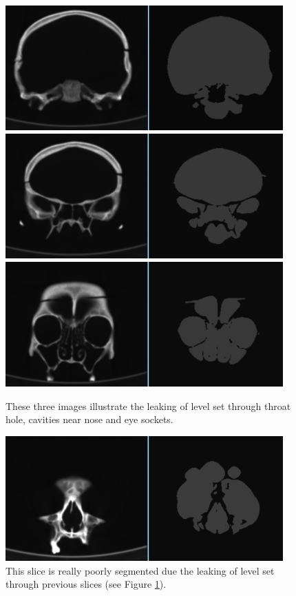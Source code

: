\begin{figure}
    \centering
    \includegraphics[width=0.95\textwidth]{data/png/20}
    \includegraphics[width=0.95\textwidth]{data/png/23}
    \includegraphics[width=0.95\textwidth]{data/png/27}
    \caption[Result of segmentation front slices of the skull data set]
{
These three images illustrate the leaking of level set through throat hole, cavities near nose and eye sockets.
}
    \label{fg:frontSlicesSegmentation}
\end{figure}

\begin{figure}
    \centering
    \includegraphics[width=0.95\textwidth]{data/png/29}
    \caption[Result of segmentation of slices near nose]{
This slice is really poorly segmented due the leaking of level set through previous slices (see Figure \ref{fg:frontSlicesSegmentation}).
}
    \label{fg:noseSlicesSegmentation}
\end{figure}

